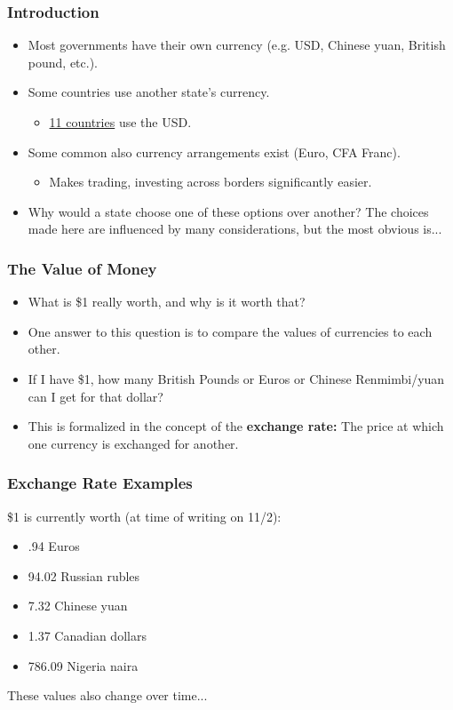 \documentclass{beamer}
\begin{document}
\begin{frame} 
	\frametitle{\LARGE{Introduction}}
	\begin{itemize}
		\item Most governments have their own currency (e.g. USD, Chinese yuan, British pound, etc.). \pause
		\item Some countries use another state's currency. \pause
		\begin{itemize}
			\item \href{https://www.investopedia.com/articles/forex/040915/countries-use-us-dollar.asp}{11 countries} use the USD. \pause 
		\end{itemize}
		\item Some common also currency arrangements exist (Euro, CFA Franc).  \pause
		\begin{itemize}
			\item Makes trading, investing across borders significantly easier. \pause 
		\end{itemize}	
		\item Why would a state choose one of these options over another? The choices made here are influenced by many considerations, but the most obvious is...
	\end{itemize}
\end{frame}


\begin{frame} 
	\frametitle{\LARGE{The Value of Money}}
	\begin{itemize}
		\item What is \$1 really worth, and why is it worth that? \pause
		\item One answer to this question is to compare the values of currencies to each other. \pause
		\item If I have \$1, how many British Pounds or Euros or Chinese Renmimbi/yuan can I get for that dollar? \pause
		\item This is formalized in the concept of the \textbf{exchange rate:} The price at which one currency is exchanged for another. 	
	\end{itemize}
\end{frame}

\begin{frame} 
	\frametitle{\LARGE{Exchange Rate Examples}}
\$1 is currently worth (at time of writing on 11/2):
	\begin{itemize}
		\item .94 Euros \pause
		\item 94.02 Russian rubles \pause
		\item 7.32 Chinese yuan \pause
		\item 1.37 Canadian dollars \pause
		\item 786.09 Nigeria naira \pause
	\end{itemize}
These values also change over time...
\end{frame}
\end{document}
